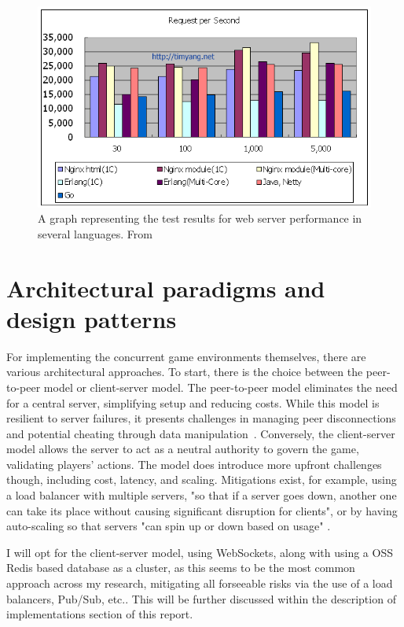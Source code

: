 \documentclass[]{interim}
\begin{document}
\begin{figure}[ht!]
  \centering
  \includegraphics[width=\linewidth]{c_erlang_java_go}
  \vspace*{-0.5cm}
  \caption{A graph representing the test results for web server performance in several languages. From \cite{yang_c_nodate}}
  \label{fig: 1}
\end{figure}

\section{Architectural paradigms and design patterns}

For implementing the concurrent game environments themselves, there are various architectural approaches.
To start, there is the choice between the peer-to-peer model or client-server model.
The peer-to-peer model eliminates the need for a central server, simplifying setup and
reducing costs. While this model is resilient to server failures, it presents challenges
in managing peer disconnections and potential cheating through data manipulation~\cite{franchetti_coping_2020}.
Conversely, the client-server model allows the server to act as a neutral authority to govern the game,
validating players' actions. The model does introduce more upfront challenges though, including cost,
latency, and scaling. Mitigations exist, for example, using a load balancer with multiple servers,
"so that if a server goes down, another one can take its place without causing significant
disruption for clients", or by having auto-scaling so that servers "can spin up or down
based on usage" \cite{pandey_peer--peer_2022}.

I will opt for the client-server model, using WebSockets, along with using a OSS Redis based database as a cluster,
as this seems to be the most common approach
across my research, mitigating all forseeable risks via the use of a load balancers,
Pub/Sub, etc.. This will be further discussed within the description of implementations section of this report.
\end{document}
